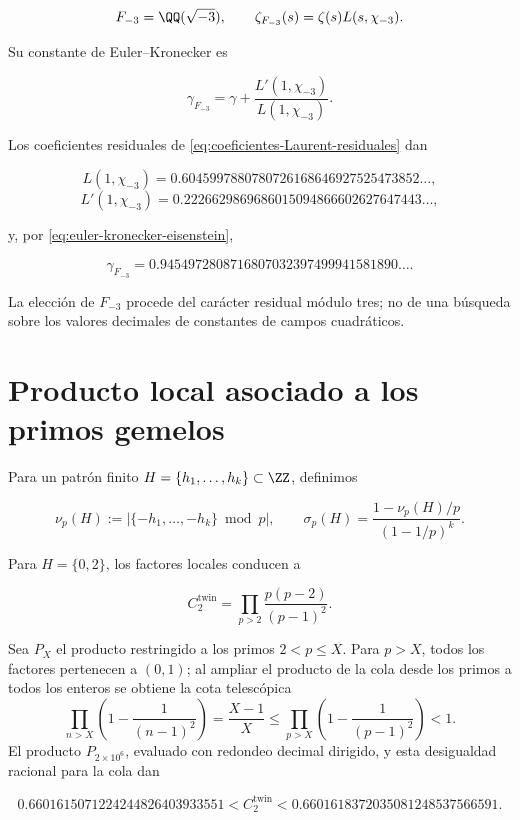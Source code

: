 \[
 F_{-3}=\QQ(\sqrt{-3}),
 \qquad
 \zeta_{F_{-3}}(s)=\zeta(s)L(s,\chi_{-3}).
\]

Su constante de Euler--Kronecker es

\begin{equation}
 \boxed{
 \gamma_{F_{-3}}
 =\gamma+\frac{L'(1,\chi_{-3})}{L(1,\chi_{-3})}}.
 \label{eq:euler-kronecker-eisenstein}
\end{equation}

Los coeficientes residuales de
\eqref{eq:coeficientes-Laurent-residuales} dan

\[
 L(1,\chi_{-3})
 =0.6045997880780726168646927525473852\ldots,
\]
\[
 L'(1,\chi_{-3})
 =0.2226629869686015094866602627647443\ldots,
\]

y, por \eqref{eq:euler-kronecker-eisenstein},

\[
 \gamma_{F_{-3}}
 =0.9454972808716807032397499941581890\ldots.
\]

La elección de $F_{-3}$ procede del carácter residual módulo tres; no de
una búsqueda sobre los valores decimales de constantes de campos
cuadráticos.

\section{Producto local asociado a los primos gemelos}

Para un patrón finito $H=\{h_1,\ldots,h_k\}\subset\ZZ$, definimos

\[
 \nu_p(H):=\left|\{-h_1,\ldots,-h_k\}\bmod p\right|,
 \qquad
 \sigma_p(H)=
 \frac{1-\nu_p(H)/p}{(1-1/p)^k}.
\]

Para $H=\{0,2\}$, los factores locales conducen a

\begin{equation}
 C_2^{\mathrm{twin}}
 =\prod_{p>2}\frac{p(p-2)}{(p-1)^2}.
 \label{eq:constante-primos-gemelos}
\end{equation}

Sea \(P_X\) el producto restringido a los primos \(2<p\leq X\). Para
\(p>X\), todos los factores pertenecen a \((0,1)\); al ampliar el producto
de la cola desde los primos a todos los enteros se obtiene la cota
telescópica
\[
 \prod_{n>X}\left(1-\frac1{(n-1)^2}\right)
 =\frac{X-1}{X}
 \leq
 \prod_{p>X}\left(1-\frac1{(p-1)^2}\right)<1.
\]
El producto \(P_{2\times10^6}\), evaluado con redondeo decimal dirigido, y
esta desigualdad racional para la cola dan

\begin{equation}
 0.6601615071224244826403933551
 <C_2^{\mathrm{twin}}<
 0.6601618372035081248537566591.
 \label{eq:intervalo-primos-gemelos}
\end{equation}

